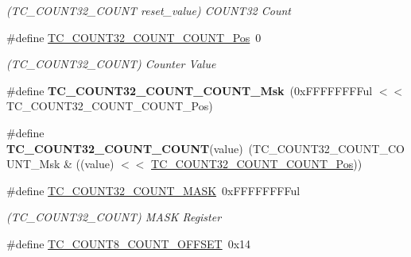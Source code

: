 \begin{DoxyCompactItemize}
\begin{DoxyCompactList}\small\item\em (T\+C\+\_\+\+C\+O\+U\+N\+T32\+\_\+\+C\+O\+U\+N\+T reset\+\_\+value) C\+O\+U\+N\+T32 Count \end{DoxyCompactList}\item 
\hypertarget{group___s_a_m_l21___t_c_gaeac7c87ea7b5a489929b6fa1c141fbaf}{}\#define \hyperlink{group___s_a_m_l21___t_c_gaeac7c87ea7b5a489929b6fa1c141fbaf}{T\+C\+\_\+\+C\+O\+U\+N\+T32\+\_\+\+C\+O\+U\+N\+T\+\_\+\+C\+O\+U\+N\+T\+\_\+\+Pos}~0\label{group___s_a_m_l21___t_c_gaeac7c87ea7b5a489929b6fa1c141fbaf}

\begin{DoxyCompactList}\small\item\em (T\+C\+\_\+\+C\+O\+U\+N\+T32\+\_\+\+C\+O\+U\+N\+T) Counter Value \end{DoxyCompactList}\item 
\hypertarget{group___s_a_m_l21___t_c_ga194f6888ec96eb753c0167461328a661}{}\#define {\bfseries T\+C\+\_\+\+C\+O\+U\+N\+T32\+\_\+\+C\+O\+U\+N\+T\+\_\+\+C\+O\+U\+N\+T\+\_\+\+Msk}~(0x\+F\+F\+F\+F\+F\+F\+F\+Ful $<$$<$ T\+C\+\_\+\+C\+O\+U\+N\+T32\+\_\+\+C\+O\+U\+N\+T\+\_\+\+C\+O\+U\+N\+T\+\_\+\+Pos)\label{group___s_a_m_l21___t_c_ga194f6888ec96eb753c0167461328a661}

\item 
\hypertarget{group___s_a_m_l21___t_c_gae01e6b763292e3d1d648a2764f2db5a9}{}\#define {\bfseries T\+C\+\_\+\+C\+O\+U\+N\+T32\+\_\+\+C\+O\+U\+N\+T\+\_\+\+C\+O\+U\+N\+T}(value)~(T\+C\+\_\+\+C\+O\+U\+N\+T32\+\_\+\+C\+O\+U\+N\+T\+\_\+\+C\+O\+U\+N\+T\+\_\+\+Msk \& ((value) $<$$<$ \hyperlink{group___s_a_m_l21___t_c_gaeac7c87ea7b5a489929b6fa1c141fbaf}{T\+C\+\_\+\+C\+O\+U\+N\+T32\+\_\+\+C\+O\+U\+N\+T\+\_\+\+C\+O\+U\+N\+T\+\_\+\+Pos}))\label{group___s_a_m_l21___t_c_gae01e6b763292e3d1d648a2764f2db5a9}

\item 
\hypertarget{group___s_a_m_l21___t_c_gac827cc52cceb457fa8fae278e21ab595}{}\#define \hyperlink{group___s_a_m_l21___t_c_gac827cc52cceb457fa8fae278e21ab595}{T\+C\+\_\+\+C\+O\+U\+N\+T32\+\_\+\+C\+O\+U\+N\+T\+\_\+\+M\+A\+S\+K}~0x\+F\+F\+F\+F\+F\+F\+F\+Ful\label{group___s_a_m_l21___t_c_gac827cc52cceb457fa8fae278e21ab595}

\begin{DoxyCompactList}\small\item\em (T\+C\+\_\+\+C\+O\+U\+N\+T32\+\_\+\+C\+O\+U\+N\+T) M\+A\+S\+K Register \end{DoxyCompactList}\item 
\hypertarget{group___s_a_m_l21___t_c_ga0023fc91813a805c71bce8d0b863d18b}{}\#define \hyperlink{group___s_a_m_l21___t_c_ga0023fc91813a805c71bce8d0b863d18b}{T\+C\+\_\+\+C\+O\+U\+N\+T8\+\_\+\+C\+O\+U\+N\+T\+\_\+\+O\+F\+F\+S\+E\+T}~0x14\label{group___s_a_m_l21___t_c_ga0023fc91813a805c71bce8d0b863d18b}


\end{DoxyCompactItemize}

